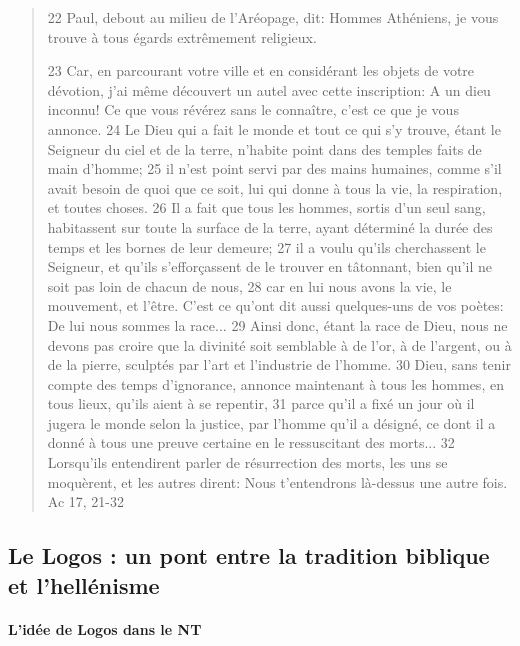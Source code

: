    \begin{quote}
   22 Paul, debout au milieu de l'Aréopage, dit: Hommes Athéniens, je vous trouve à tous égards extrêmement religieux.

23 Car, en parcourant votre ville et en considérant les objets de votre dévotion, j'ai même découvert un autel avec cette inscription: A un dieu inconnu! Ce que vous révérez sans le connaître, c'est ce que je vous annonce.
24 Le Dieu qui a fait le monde et tout ce qui s'y trouve, étant le Seigneur du ciel et de la terre, n'habite point dans des temples faits de main d'homme;
25 il n'est point servi par des mains humaines, comme s'il avait besoin de quoi que ce soit, lui qui donne à tous la vie, la respiration, et toutes choses.
26 Il a fait que tous les hommes, sortis d'un seul sang, habitassent sur toute la surface de la terre, ayant déterminé la durée des temps et les bornes de leur demeure;
27 il a voulu qu'ils cherchassent le Seigneur, et qu'ils s'efforçassent de le trouver en tâtonnant, bien qu'il ne soit pas loin de chacun de nous,
28 car en lui nous avons la vie, le mouvement, et l'être. C'est ce qu'ont dit aussi quelques-uns de vos poètes: De lui nous sommes la race...
29 Ainsi donc, étant la race de Dieu, nous ne devons pas croire que la divinité soit semblable à de l'or, à de l'argent, ou à de la pierre, sculptés par l'art et l'industrie de l'homme.
30 Dieu, sans tenir compte des temps d'ignorance, annonce maintenant à tous les hommes, en tous lieux, qu'ils aient à se repentir,
31 parce qu'il a fixé un jour où il jugera le monde selon la justice, par l'homme qu'il a désigné, ce dont il a donné à tous une preuve certaine en le ressuscitant des morts...
32 Lorsqu'ils entendirent parler de résurrection des morts, les uns se moquèrent, et les autres dirent: Nous t'entendrons là-dessus une autre fois.
       Ac 17, 21-32
   \end{quote}

    
    \subsection{Le Logos : un pont entre la tradition biblique et
    l'hellénisme}

    

  

     
      
      \paragraph{L'idée de Logos dans le NT}
      
